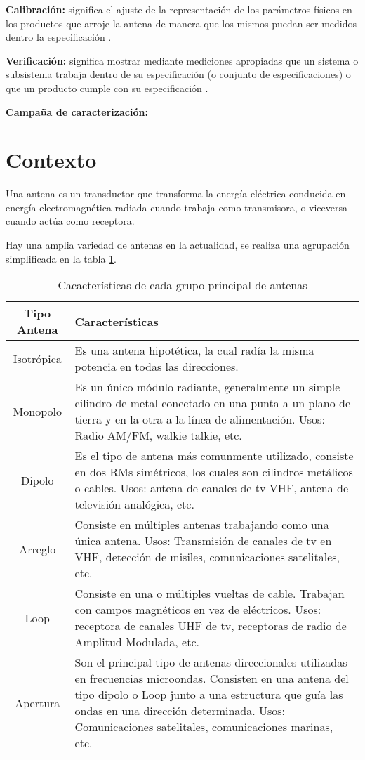 {\textbf{Calibración:}} significa el ajuste de la representación de los parámetros físicos en los productos que arroje la 
antena de manera que los mismos puedan ser medidos dentro la especificación \cite{Mittermayer2007}.

{\textbf{Verificación:}} significa mostrar mediante mediciones apropiadas que un sistema o subsistema trabaja dentro de su 
especificación (o conjunto de especificaciones) o que un producto cumple con su especificación \cite{Mittermayer2007}.


{\textbf{Campaña de caracterización:}}

\section{Contexto}

Una antena es un transductor que transforma la energía eléctrica conducida en energía electromagnética radiada cuando 
trabaja como transmisora, o viceversa cuando actúa como receptora.

Hay una amplia variedad de antenas en la actualidad, se realiza una agrupación simplificada en la tabla \ref{tab:type_antennas}.

\begin{table}[H]
  \footnotesize
  \centering
  \begin{tabular}{|c|p{9cm}|}
	\hline
	\textbf{Tipo Antena} & \textbf{Características} \\\hline
	Isotrópica & Es una antena hipotética, la cual radía la misma potencia en todas las direcciones.\\\hline
	Monopolo & Es un único módulo radiante, generalmente un simple cilindro de metal conectado en una punta a un plano de 
	tierra y en la otra a la línea de alimentación. Usos: Radio AM/FM, walkie talkie, etc. \\\hline
	Dipolo & Es el tipo de antena más comunmente utilizado, consiste en dos RMs simétricos, los cuales son cilindros 
	metálicos o cables. Usos: antena de canales de tv VHF, antena de televisión analógica, etc. \\\hline
	Arreglo & Consiste en múltiples antenas trabajando como una única antena. Usos: Transmisión de canales de tv en VHF, 
	detección de misiles, comunicaciones satelitales, etc.\\\hline
	Loop & Consiste en una o múltiples vueltas de cable. Trabajan con campos magnéticos en vez de eléctricos. Usos: receptora 
	de canales UHF de tv, receptoras de radio de Amplitud Modulada, etc.\\\hline
	Apertura & Son el principal tipo de antenas direccionales utilizadas en frecuencias microondas. Consisten en una antena 
	del tipo dipolo o Loop junto a una estructura que guía las ondas en una dirección determinada. Usos: Comunicaciones 
	satelitales, comunicaciones marinas, etc.\\\hline
  \end{tabular}
  \caption{Cacacterísticas de cada grupo principal de antenas}
  \label{tab:type_antennas}
\end{table}

